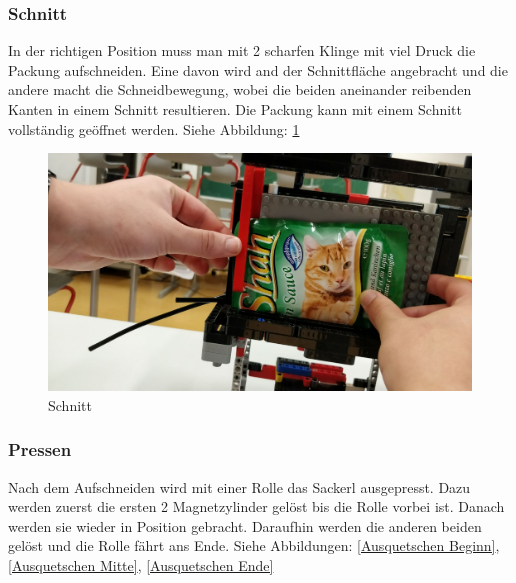 \newpage
\subsubsection{Schnitt}

In der richtigen Position muss man mit 2 scharfen Klinge mit viel Druck die Packung aufschneiden. Eine davon wird and der Schnittfläche angebracht und die andere macht die Schneidbewegung, wobei die beiden aneinander reibenden Kanten in einem Schnitt resultieren. Die Packung kann mit einem Schnitt vollständig geöffnet werden. Siehe Abbildung: \ref{Schnitt}

\begin{figure}[H]
\begin{center}
\includegraphics[width=13cm]{Bilder/Ablauf_1_png/Schnitt}
\caption{Schnitt}
\label{Schnitt}
\end{center}
\end{figure} 

\newpage
\subsubsection{Pressen}

Nach dem Aufschneiden wird mit einer Rolle das Sackerl ausgepresst. Dazu werden zuerst die ersten 2 Magnetzylinder gelöst bis die Rolle vorbei ist. Danach werden sie wieder in Position gebracht. Daraufhin werden die anderen beiden gelöst und die Rolle fährt ans Ende. Siehe Abbildungen: \ref{Ausquetschen Beginn}, \ref{Ausquetschen Mitte}, \ref{Ausquetschen Ende}

